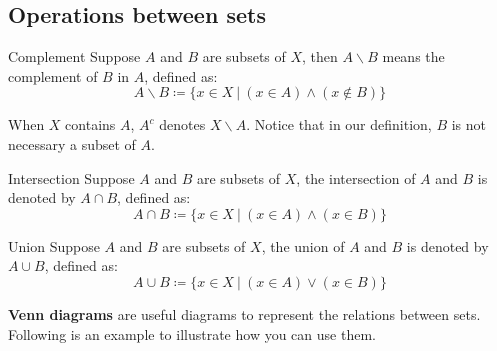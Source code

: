 \documentclass{article}
\begin{document}
\subsection{Operations between sets}
\begin{defin}{Complement}
    Suppose $A$ and $B$ are subsets of $X$, then $A \backslash B$ means the complement of $B$ in $A$, defined as:
    $$
    A \backslash B \coloneqq \{x \in X\ |\ (x \in A) \land (x \not \in B)\}
    $$

\end{defin}
When $X$ contains $A$, $A^c$ denotes $X\backslash A$. Notice that in our definition, $B$ is not necessary a subset of $A$.
\begin{defin}{Intersection}
    Suppose $A$ and $B$ are subsets of $X$, the intersection of $A$ and $B$ is denoted by $A \cap B$, defined as:
    $$
    A \cap B \coloneqq \{x \in X\ |\ (x \in A) \land (x \in B)\}
    $$
\end{defin}
\begin{defin}{Union}
    Suppose $A$ and $B$ are subsets of $X$, the union of $A$ and $B$ is denoted by $A \cup B$, defined as:
    $$
    A \cup B \coloneqq \{x \in X\ |\ (x \in A) \lor (x \in B)\}
    $$
\end{defin}
\textbf{Venn diagrams} are useful diagrams to represent the relations between sets. Following is an example to illustrate how you
can use them.
\end{document}
